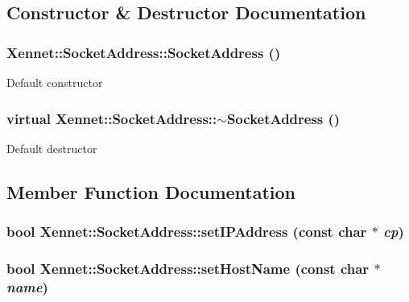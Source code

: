 \subsection{Constructor \& Destructor Documentation}
\hypertarget{classXennet_1_1SocketAddress_16e560d92d78862d8c0da3c64d35d079}{
\subsubsection{\setlength{\rightskip}{0pt plus 5cm}Xennet::SocketAddress::SocketAddress ()}}
\label{classXennet_1_1SocketAddress_16e560d92d78862d8c0da3c64d35d079}


Default constructor \hypertarget{classXennet_1_1SocketAddress_2e9d46f52ab4472f59c71a4dff475cd8}{
\subsubsection{\setlength{\rightskip}{0pt plus 5cm}virtual Xennet::SocketAddress::$\sim$SocketAddress ()}}
\label{classXennet_1_1SocketAddress_2e9d46f52ab4472f59c71a4dff475cd8}


Default destructor 

\subsection{Member Function Documentation}
\hypertarget{classXennet_1_1SocketAddress_f5ca7d803d46ad00be03c16f0d66205d}{
\subsubsection{\setlength{\rightskip}{0pt plus 5cm}bool Xennet::SocketAddress::setIPAddress (const char $\ast$ {\em cp})}}
\label{classXennet_1_1SocketAddress_f5ca7d803d46ad00be03c16f0d66205d}


\hypertarget{classXennet_1_1SocketAddress_a2c1c5639ce81303df2107fae300e5b8}{
\subsubsection{\setlength{\rightskip}{0pt plus 5cm}bool Xennet::SocketAddress::setHostName (const char $\ast$ {\em name})}}
\label{classXennet_1_1SocketAddress_a2c1c5639ce81303df2107fae300e5b8}


